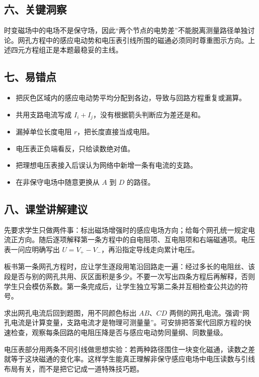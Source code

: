 \documentclass[12pt,a4paper,UTF8]{ctexart}
\newcommand{\tightlist}{\setlength{\itemsep}{0pt}\setlength{\parskip}{0pt}}
\begin{document}
\subsection{六、关键洞察}\label{ux516dux5173ux952eux6d1eux5bdf-3}

时变磁场中的电场不是保守场，因此``两个节点的电势差''不能脱离测量路径单独讨论。网孔方程中的感应电动势和电压表引线所围的磁通必须同时尊重图示方向。上述四元方程组正是本题最稳妥的主线。

\subsection{七、易错点}\label{ux4e03ux6613ux9519ux70b9-3}

\begin{itemize}
\tightlist
\item
  把灰色区域内的感应电动势平均分配到各边，导致与回路方程重复或漏算。
\item
  共用支路电流写成 \(I_i+I_j\)，没有根据箭头判断应为差还是和。
\item
  漏掉单位长度电阻 \(r\)，把长度直接当成电阻。
\item
  电压表正负端看反，只给读数绝对值。
\item
  把理想电压表接入后误认为网络中新增一条有电流的支路。
\item
  在非保守电场中随意更换从 \(A\) 到 \(D\) 的路径。
\end{itemize}

\subsection{八、课堂讲解建议}\label{ux516bux8bfeux5802ux8bb2ux89e3ux5efaux8bae-3}

先要求学生只做两件事：标出磁场增强时的感应电场方向；给每个网孔统一规定电流正方向。随后逐项解释第一条方程中的自电阻项、互电阻项和右端磁通项。电压表一问应明确写出
\(U=V_+-V_-\)，再沿指定导线走向累计电压。

板书第一条网孔方程时，应让学生逐段用笔沿回路走一遍：经过多长的电阻丝、该段是否与别的网孔共用、灰区面积是多少。不要一次写出四条方程后再解释，否则学生只会模仿系数。第一条完成后，让学生独立写第二条并互相检查公共边的符号。

求出网孔电流后回到题图，用不同颜色标出 \(AB\)、\(CD\)
两侧的网孔电流。强调``网孔电流是计算变量，支路电流才是物理可测量量''。可安排把答案代回原方程的快速检查，观察每条回路的电阻压降是否与感应电动势同量纲、同数量级。

电压表部分用两条不同引线做思想实验：若两种路径围住一块变化磁通，读数之差就等于这块磁通的变化率。这样学生能真正理解非保守感应电场中电压读数与引线布局有关，而不是把它记成一道特殊技巧题。
\end{document}
